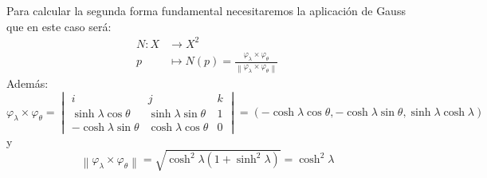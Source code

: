 Para calcular la segunda forma fundamental necesitaremos la aplicación de Gauss
que en este caso será:
\begin{align*}
    N : X &\rightarrow X^2\\
    p &\mapsto N\left( p \right) = \frac{\varphi_{\lambda} \times
    \varphi_{\theta}}{\left\lVert \varphi_{\lambda} \times \varphi_{\theta} \right\rVert}
\end{align*}
Además:
\[
\varphi_{\lambda} \times \varphi_{\theta} = \begin{vmatrix} 
    i & j & k\\
    \sinh \lambda \cos \theta & \sinh \lambda \sin \theta & 1\\
    -\cosh \lambda \sin \theta & \cosh \lambda \cos \theta & 0
\end{vmatrix} = \left( -\cosh \lambda \cos \theta, -\cosh \lambda \sin \theta,
\sinh \lambda \cosh \lambda \right)
\]
y
\[
\left\lVert \varphi_{\lambda} \times \varphi_{\theta} \right\rVert =
\sqrt{\cosh^2 \lambda \left( 1 + \sinh^2 \lambda \right)} = \cosh^2 \lambda
\]
